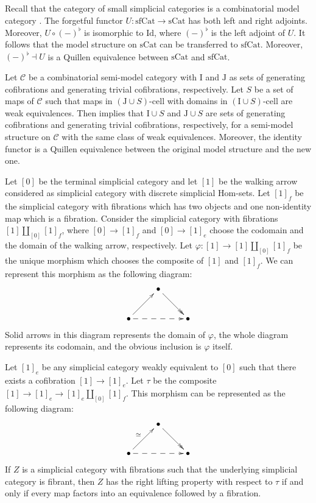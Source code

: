 \documentclass[reqno]{amsart}
\theoremstyle{definition}
\theoremstyle{remark}
\newcommand{\fs}[1]{\mathrm{#1}}
\newcommand{\Hom}{\fs{Hom}}
\newcommand{\cat}[1]{\mathcal{#1}}
\newcommand{\C}{\cat{C}}
\newcommand{\Id}{\fs{Id}}
\newcommand{\sCat}{\fs{sCat}}
\newcommand{\sfCat}{\fs{sfCat}}
\newcommand{\I}{\fs{I}}
\newcommand{\J}{\fs{J}}
\newcommand{\class}[2]{#1\text{-}\mathrm{#2}}
\newcommand{\Icell}[1][\I]{\class{#1}{cell}}
\numberwithin{figure}{section}
\begin{document}
Recall that the category of small simplicial categories is a combinatorial model category \cite[Proposition~A.3.2.4]{lurie-topos}.
The forgetful functor $U : \sfCat \to \sCat$ has both left and right adjoints.
Moreover, $U \circ (-)^\flat$ is isomorphic to $\Id$, where $(-)^\flat$ is the left adjoint of $U$.
It follows that the model structure on $\sCat$ can be transferred to $\sfCat$.
Moreover, $(-)^\flat \dashv U$ is a Quillen equivalence between $\sCat$ and $\sfCat$.

Let $\C$ be a combinatorial semi-model category with $\I$ and $\J$ as sets of generating cofibrations and generating trivial cofibrations, respectively.
Let $S$ be a set of maps of $\C$ such that maps in $\Icell[(\J \cup S)]$ with domains in $\Icell[(\I \cup S)]$ are weak equivalences.
Then  implies that $\I \cup S$ and $\J \cup S$ are sets of generating cofibrations and generating trivial cofibrations, respectively, for a semi-model structure on $\C$ with the same class of weak equivalences.
Moreover, the identity functor is a Quillen equivalence between the original model structure and the new one.

Let $[0]$ be the terminal simplicial category and let $[1]$ be the walking arrow considered as simplicial category with discrete simplicial $\Hom$-sets.
Let $[1]_f$ be the simplicial category with fibrations which has two objects and one non-identity map which is a fibration.
Consider the simplicial category with fibrations $[1] \amalg_{[0]} [1]_f$, where $[0] \to [1]_f$ and $[0] \to [1]_e$ choose the codomain and the domain of the walking arrow, respectively.
Let $\varphi : [1] \to [1] \amalg_{[0]} [1]_f$ be the unique morphism which chooses the composite of $[1]$ and $[1]_f$.
We can represent this morphism as the following diagram:
\[ \xymatrix{                               & \bullet \ar@{->>}[dr] & \\
              \bullet \ar[ur] \ar@{-->}[rr] &                       & \bullet
            } \]
Solid arrows in this diagram represents the domain of $\varphi$, the whole diagram represents its codomain, and the obvious inclusion is $\varphi$ itself.

Let $[1]_e$ be any simplicial category weakly equivalent to $[0]$ such that there exists a cofibration $[1] \to [1]_e$.
Let $\tau$ be the composite $[1] \to [1]_e \to [1]_e \amalg_{[0]} [1]_f$.
This morphism can be represented as the following diagram:
\[ \xymatrix{                                        & \bullet \ar@{->>}[dr] & \\
              \bullet \ar[ur]^{\simeq} \ar@{-->}[rr] &                       & \bullet
            } \]
If $Z$ is a simplicial category with fibrations such that the underlying simplicial category is fibrant,
then $Z$ has the right lifting property with respect to $\tau$ if and only if every map factors into an equivalence followed by a fibration.
\end{document}
